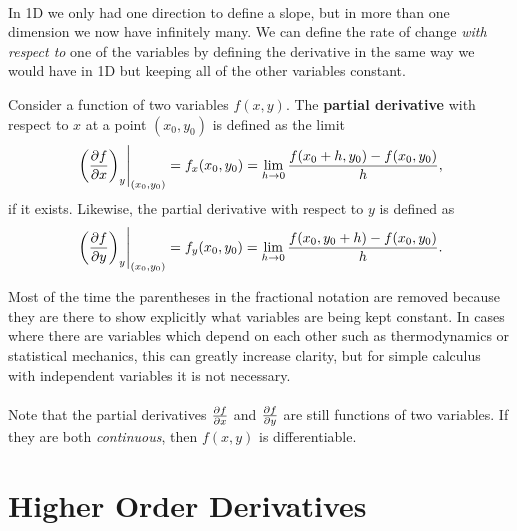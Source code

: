 \documentclass[../multivariate_calculus.tex]{subfiles}
\begin{document}
        \paragraph{}
        In 1D we only had one direction to define a slope, but in more than one dimension we now have infinitely many.
        We can define the rate of change \textit{with respect to} one of the variables by defining the derivative in the same way we would have in 1D but keeping all of the other variables constant.
        \begin{definition}
            Consider a function of two variables $f(x,y)$.
            The \textbf{partial derivative} with respect to $x$ at a point $(x_0,y_0)$ is defined as the limit
            \begin{equation}
                \left.\left(\pdv{f}{x}\right)_y\right|_{(x_0,y_0)}=f_x(x_0,y_0)=\lim_{h\to 0}\frac{f(x_0+h,y_0)-f(x_0,y_0)}{h},
            \end{equation}
            if it exists.
            Likewise, the partial derivative with respect to $y$ is defined as
            \begin{equation}
                \left.\left(\pdv{f}{y}\right)_y\right|_{(x_0,y_0)}=f_y(x_0,y_0)=\lim_{h\to 0}\frac{f(x_0,y_0+h)-f(x_0,y_0)}{h}.
            \end{equation}
        \end{definition}
        Most of the time the parentheses in the fractional notation are removed because they are there to show explicitly what variables are being kept constant.
        In cases where there are variables which depend on each other such as thermodynamics or statistical mechanics, this can greatly increase clarity, but for simple calculus with independent variables it is not necessary.

        \paragraph{}
        Note that the partial derivatives $\pdv{f}{x}$ and $\pdv{f}{y}$ are still functions of two variables.
        If they are both \textit{continuous}, then $f(x,y)$ is differentiable.

    \section{Higher Order Derivatives}
\end{document}
